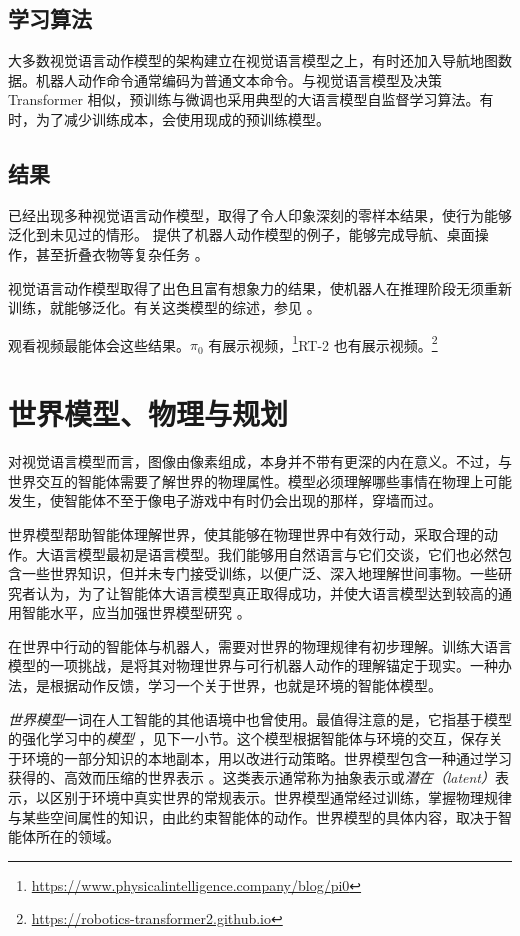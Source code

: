 \subsection{学习算法}
大多数视觉语言动作模型的架构建立在视觉语言模型之上，有时还加入导航地图数据。机器人动作命令通常编码为普通文本命令。与视觉语言模型及决策 Transformer 相似，预训练与微调也采用典型的大语言模型自监督学习算法。有时，为了减少训练成本，会使用现成的预训练模型。

\subsection{结果}
已经出现多种视觉语言动作模型，取得了令人印象深刻的零样本结果，使行为能够泛化到未见过的情形。\citet{chiang2024mobility,brohan2023rt,yang2025magma} 提供了机器人动作模型的例子，能够完成导航、桌面操作，甚至折叠衣物等复杂任务 \citep{black2024pi_0}。

视觉语言动作模型取得了出色且富有想象力的结果，使机器人在推理阶段无须重新训练，就能够泛化。有关这类模型的综述，参见 \citep{ma2024survey}。

观看视频最能体会这些结果。$\pi_0$ 有展示视频，\footnote{\url{https://www.physicalintelligence.company/blog/pi0}}RT-2 也有展示视频。\footnote{\url{https://robotics-transformer2.github.io}}

\section{世界模型、物理与规划}\label{sec:world}

对视觉语言模型而言，图像由像素组成，本身并不带有更深的内在意义。不过，与世界交互的智能体需要了解世界的物理属性。模型必须理解哪些事情在物理上可能发生，使智能体不至于像电子游戏中有时仍会出现的那样，穿墙而过。

世界模型帮助智能体理解世界，使其能够在物理世界中有效行动，采取合理的动作。大语言模型最初是语言模型。我们能够用自然语言与它们交谈，它们也必然包含一些世界知识，但并未专门接受训练，以便广泛、深入地理解世间事物。一些研究者认为，为了让智能体大语言模型真正取得成功，并使大语言模型达到较高的通用智能水平，应当加强世界模型研究 \citep{sutton2022alberta,matsuo2022deep,lecun2022path,klindt2026does}。

在世界中行动的智能体与机器人，需要对世界的物理规律有初步理解。训练大语言模型的一项挑战，是将其对物理世界与可行机器人动作的理解锚定于现实。一种办法，是根据动作反馈，学习一个关于世界，也就是环境的智能体模型。

{\em 世界模型}一词在人工智能的其他语境中也曾使用。最值得注意的是，它指基于模型的强化学习中的{\em 模型} \citep{ha2018world,moerland2023model,sutton1991dyna}，见下一小节。这个模型根据智能体与环境的交互，保存关于环境的一部分知识的本地副本，用以改进行动策略。世界模型包含一种通过学习获得的、高效而压缩的世界表示 \citep{hafner2018learning,plaat2020deep}。这类表示通常称为抽象表示或{\em 潜在（latent）}表示，以区别于环境中真实世界的常规表示。世界模型通常经过训练，掌握物理规律与某些空间属性的知识，由此约束智能体的动作。世界模型的具体内容，取决于智能体所在的领域。

